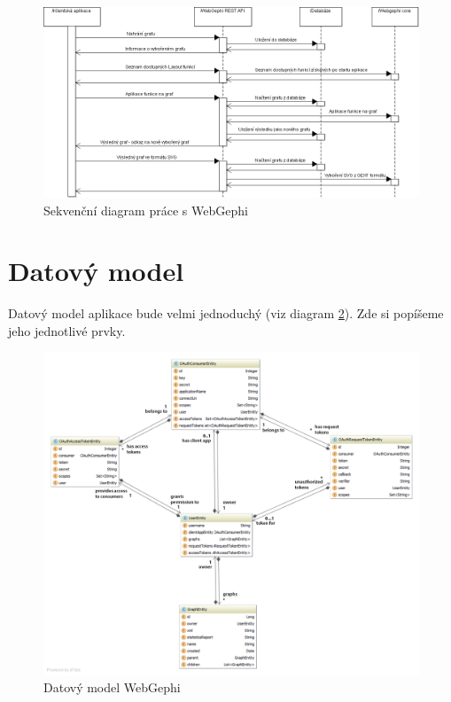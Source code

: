 \documentclass[thesis=M,czech]{FITthesis}[2014/05/6]
\begin{document}
\begin{figure}\centering
 	\includegraphics[width=1\textwidth]{images/diagram/webgephi_workflow}
 	\caption[Sekvenční diagram práce s WebGephi]{Sekvenční diagram práce s WebGephi}\label{fig:webgephi-workflow}
\end{figure}

\section{Datový model}
Datový model aplikace bude velmi jednoduchý (viz diagram \ref{fig:webgephi-dbmodel}). Zde si popíšeme jeho jednotlivé prvky.

\begin{figure}\centering
 	\includegraphics[width=1\textwidth]{images/class-diagram/db_model}
 	\caption[Datový model WebGephi]{Datový model WebGephi}\label{fig:webgephi-dbmodel}
\end{figure}
\end{document}
